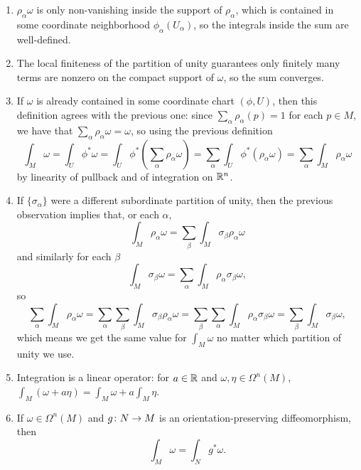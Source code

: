 \begin{remark}
	\begin{enumerate}
		\item $\rho_\alpha \omega$ is only non-vanishing inside the support of $\rho_\alpha$, which is contained in some coordinate neighborhood $\phi_\alpha(U_\alpha)$, so the integrals inside the sum are well-defined.
		\item The local finiteness of the partition of unity guarantees only finitely many terms are nonzero on the compact support of $\omega$, so the sum converges.
		\item If $\omega$ is already contained in some coordinate chart $(\phi, U)$, then this definition agrees with the previous one: since $\sum_\alpha \rho_\alpha(p) = 1$ for each $p \in M$, we have that $\sum_\alpha \rho_\alpha \omega = \omega$, so using the previous definition
		\[
			\int_M \omega = \int_U \phi^\ast \omega = \int_U \phi^\ast(\sum_\alpha \rho_\alpha \omega) = \sum_\alpha \int_U \phi^\ast(\rho_\alpha \omega) = \sum_\alpha \int_M \rho_\alpha \omega
		\]
		by linearity of pullback and of integration on $\mathbb{R}^n$.
		\item If $\{\sigma_\alpha\}$ were a different subordinate partition of unity, then the previous observation implies that, or each $\alpha$,
		\[
			\int_M \rho_\alpha \omega = \sum_\beta \int_M \sigma_\beta \rho_\alpha \omega
		\]
		and similarly for each $\beta$
		\[
			\int_M \sigma_\beta \omega = \sum_\alpha \int_M \rho_\alpha \sigma_\beta \omega,
		\]
		so
		\[
			\sum_\alpha \int_M \rho_\alpha \omega = \sum_\alpha \sum_\beta \int_M \sigma_\beta \rho_\alpha \omega = \sum_\beta \sum_\alpha \int_M \rho_\alpha \sigma_\beta \omega = \sum_\beta \int_M \sigma_\beta \omega,
		\]
		which means we get the same value for $\int_M \omega$ no matter which partition of unity we use.
		\item Integration is a linear operator: for $a \in \mathbb{R}$ and $\omega, \eta \in \Omega^n(M)$, $\int_M (\omega + a \eta) = \int_M \omega + a \int_M \eta$.
		\item If $\omega \in \Omega^n(M)$ and $g \colon\thinspace\! N \to M$ is an orientation-preserving diffeomorphism, then
		\[
			\int_M \omega = \int_N g^\ast \omega.
		\]
	\end{enumerate}
\end{remark}

